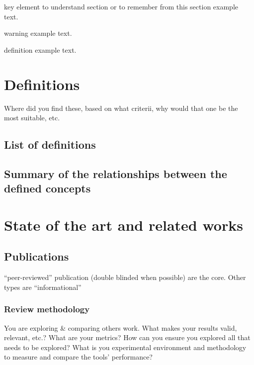 \begin{bclogo}[arrondi=0.1, logo=\bccle, couleur=grey,noborder=true]{key element to understand section or to remember from this section}
  example text.
\end{bclogo}

\begin{bclogo}[arrondi=0.1, logo=\bcbombe, couleur=grey,noborder=true]{warning}
  example text.
\end{bclogo}

\begin{bclogo}[arrondi=0.1, logo=\bcbook, couleur=grey,noborder=true]{definition}
  example text.
\end{bclogo}

\section{Definitions}

Where did you find these, based on what criterii, why would that one be the most suitable, etc.

\subsection{List of definitions}

\subsection{Summary of the relationships between the defined concepts}

\section{State of the art and related works}

\subsection{Publications}

\enquote{peer-reviewed} publication (double blinded when possible) are the
core. Other types are \enquote{informational}

\subsubsection{Review methodology}

You are exploring \& comparing others work. What makes your results valid,
relevant, etc.? What are your metrics? How can you ensure you explored all
that needs to be explored? What is you experimental environment and
methodology to measure and compare the tools' performance?

